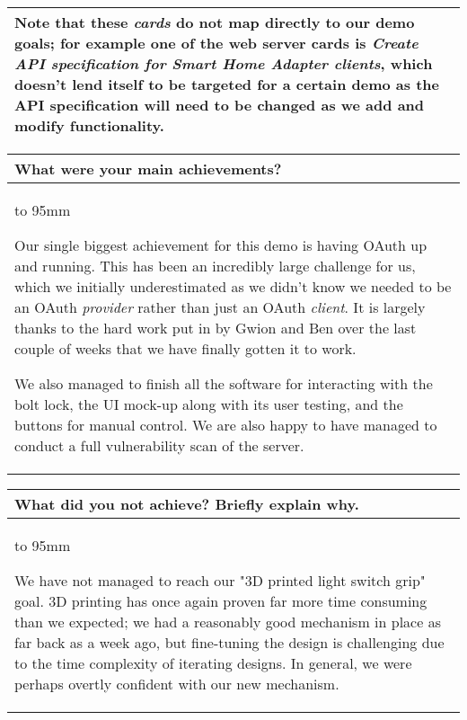 \documentclass[a4paper]{article}
\newcommand{\colWidth}{141mm}
\begin{document}
\begin{center}
\begin{tabular}{|p{\colWidth}|}
		\vspace{3mm}

		Note that these \textit{cards} do not map directly to our demo goals; for example one of the web server cards is \textit{Create API specification for Smart Home Adapter clients},
		which doesn't lend itself to be targeted for a certain demo as the API specification will need to be changed as we add and modify functionality.
	
  \\
  \hline
\end{tabular}
\vskip 5mm


\begin{tabular}{|p{\colWidth}|}
	\hline
	\cellcolor{blue!25}\large
	\textbf{What were your main achievements?}
	\\ \hline
	\vtop to 95mm{
		Our single biggest achievement for this demo is having OAuth up and running.
		This has been an incredibly large challenge for us, which we initially underestimated as we didn't know we
		needed to be an OAuth \textit{provider} rather than just an OAuth \textit{client}.
		It is largely thanks to the hard work put in by Gwion and Ben over the last couple of weeks that
		we have finally gotten it to work.
		
		\vspace{3mm}
		
		We also managed to finish all the software for interacting with the bolt lock, the UI mock-up along with its user testing, and the buttons for manual control. We are also happy to have managed to conduct a full vulnerability scan of the server.
	}
  \\
  \hline
\end{tabular}
\vskip 5mm


\begin{tabular}{|p{\colWidth}|}
	\hline
	\cellcolor{blue!25}\large
	\textbf{What did you not achieve? Briefly explain why.}
	\\ \hline
	\vtop to 95mm{
		We have not managed to reach our "3D printed light switch grip" goal.
		3D printing has once again proven far more time consuming than we expected; we had a
		reasonably good mechanism in place as far back as a week ago, but fine-tuning the
		design is challenging due to the time complexity of iterating designs. In general,
		we were perhaps overtly confident with our new mechanism.
		
}
\end{tabular}
\end{center}
\end{document}

